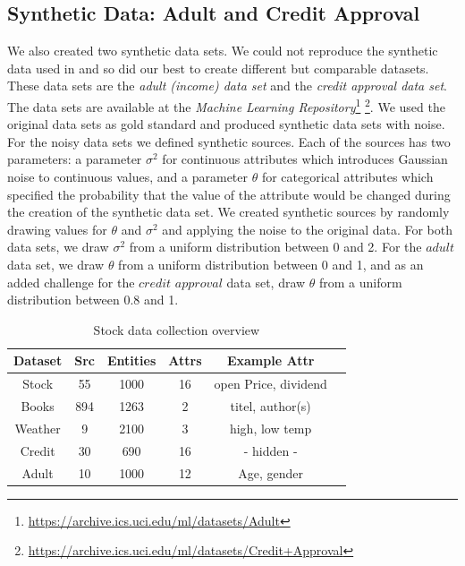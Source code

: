 \documentclass{acm_proc_article-sp}
\begin{document}
\subsection{Synthetic Data: Adult and Credit Approval} \label{sec:synth}

We also created two synthetic data sets. We could not reproduce the synthetic data used in \cite{li:resolving} and so did our best to create different but comparable datasets. These data sets are the \emph{adult (income) data set} and the \emph{credit approval data set}. The data sets are available at the \emph{Machine Learning Repository}\footnote{\url{https://archive.ics.uci.edu/ml/datasets/Adult}}
\footnote{\url{https://archive.ics.uci.edu/ml/datasets/Credit+Approval}}. We used the original data sets as gold standard and produced synthetic data sets with noise. For the noisy data sets we defined synthetic sources. Each of the sources has two parameters: a parameter $\sigma^2$ for continuous attributes which introduces Gaussian noise to continuous values, and a parameter $\theta$ for categorical attributes which specified the probability that the value of the attribute would be changed during the creation of the synthetic data set. We created synthetic sources by randomly drawing values for $\theta$ and $\sigma^2$ and applying the noise to the original data. For both data sets, we draw $\sigma^2$ from a uniform distribution between 0 and 2. For the $adult$ data set, we draw $\theta$ from a uniform distribution between 0 and 1, and as an added challenge for the $credit$ $approval$ data set, draw $\theta$ from a uniform distribution between $0.8$ and 1. 

\begin{table}[h] 
    \centering
{%
\begin{tabular}{  | c | c | c | c  | c | c |}		
\hline
\textbf{Dataset} & \textbf{Src} &  \textbf{Entities} & \textbf{Attrs}  & \textbf{Example Attr}  \\
\hline
 Stock & 55 &   1000 & 16 &  open Price, dividend   \\
 Books & 894 &   1263 & 2 &  titel, author(s)   \\
 Weather & 9 &   2100 & 3 &  high, low temp   \\
 Credit & 30 &   690 & 16 &  - hidden -   \\
 Adult & 10 &   1000 & 12 &  Age, gender   \\
\hline
\end{tabular}
}
 \caption{Stock data collection overview}%
    \label{fig:stock}%
\end{table}
\end{document}
